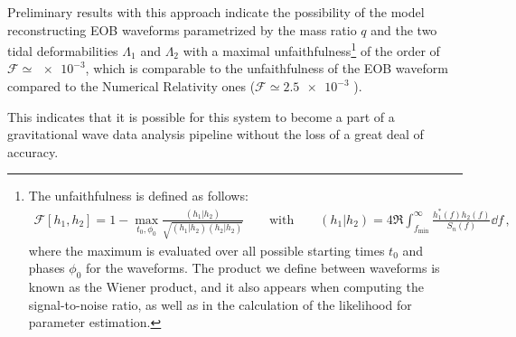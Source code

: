 \documentclass[11pt]{article}
\begin{document}
Preliminary results with this approach indicate the possibility of the model reconstructing EOB waveforms parametrized by the mass ratio \(q\) and the two tidal deformabilities \(\Lambda_1\) and \(\Lambda_2 \) with a maximal unfaithfulness\footnote{The unfaithfulness is defined as follows: 
%
\begin{align}
\mathcal{F} [h_1 , h_2 ] = 1 - \max_{t_0, \phi_0 } \frac{(h_1 | h_2 )}{\sqrt{(h_1 | h_2 ) (h_2 | h_2 )}}
\qquad \text{with} \qquad
(h_1 | h_2 ) = 4 \Re \int_{f _{\text{min}}}^{\infty } \frac{h_1^{*} (f) h_2 (f)}{S_n (f)} \dd{f}
\,,
\end{align}
%
where the maximum is evaluated over all possible starting times \(t_0 \) and phases \(\phi_0 \) for the waveforms. The product we define between waveforms is known as the Wiener product, and it also appears when computing the signal-to-noise ratio, as well as in the calculation of the likelihood for parameter estimation. 
} of the order of \(\mathcal{F} \simeq \num{e-3}\), which is comparable to the unfaithfulness of the EOB waveform compared to the Numerical Relativity ones (\(\mathcal{F} \simeq \num{2.5e-3}\) \cite[]{nagarTimedomainEffectiveonebodyGravitational2018}).

This indicates that it is possible for this system to become a part of a gravitational wave data analysis pipeline without the loss of a great deal of accuracy. 

\printbibliography
\end{document}
